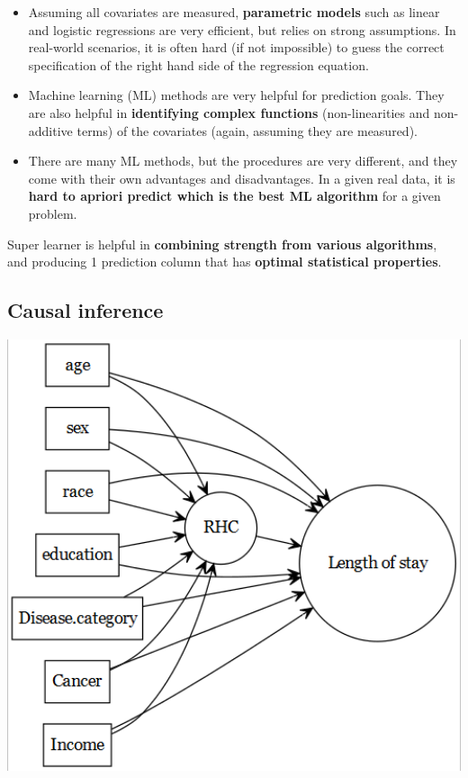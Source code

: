 \documentclass[
]{book}
\providecommand{\tightlist}{%
  \setlength{\itemsep}{0pt}\setlength{\parskip}{0pt}}
\begin{document}
\begin{itemize}
\tightlist
\item
  Assuming all covariates are measured, \textbf{parametric models} such as linear and logistic regressions are very efficient, but relies on strong assumptions. In real-world scenarios, it is often hard (if not impossible) to guess the correct specification of the right hand side of the regression equation.
\item
  Machine learning (ML) methods are very helpful for prediction goals. They are also helpful in \textbf{identifying complex functions} (non-linearities and non-additive terms) of the covariates (again, assuming they are measured).
\item
  There are many ML methods, but the procedures are very different, and they come with their own advantages and disadvantages. In a given real data, it is \textbf{hard to apriori predict which is the best ML algorithm} for a given problem.
\end{itemize}

\begin{rmdcomment}
Super learner is helpful in \textbf{combining strength from various
algorithms}, and producing 1 prediction column that has \textbf{optimal
statistical properties}.
\end{rmdcomment}

\hypertarget{causal-inference}{%
\subsection{Causal inference}\label{causal-inference}}

\includegraphics[width=6.72in]{images/dagci}
\end{document}
